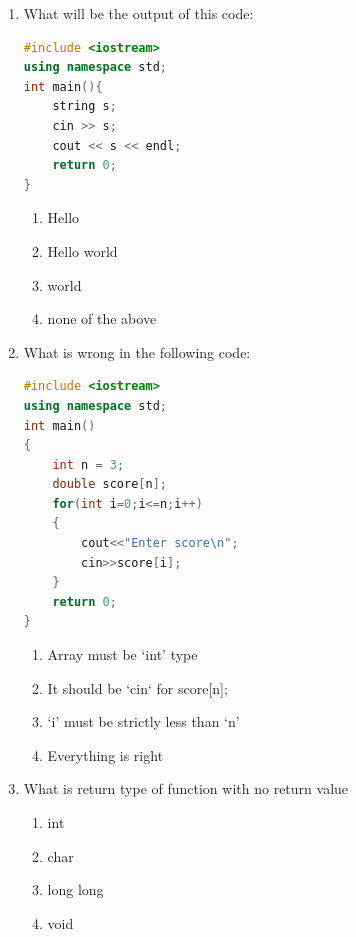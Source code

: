 \documentclass[10pt]{article}
\begin{document}
\begin{enumerate}
\item What will be the output of this code:
\begin{lstlisting}[language=C++]
#include <iostream>
using namespace std;
int main(){
    string s;
    cin >> s;
    cout << s << endl;
    return 0;
}
\end{lstlisting}
\begin{multicols}{4}
\begin{enumerate}
    \item Hello
    \item Hello world
    \item world
    \item none of the above
\end{enumerate}
\end{multicols}








\item What is wrong in the following code:
\begin{lstlisting}[language=C++]
#include <iostream>
using namespace std;
int main()
{
    int n = 3;
    double score[n];
    for(int i=0;i<=n;i++)
    {
        cout<<"Enter score\n";
        cin>>score[i];
    }
    return 0;
}
\end{lstlisting}
\begin{multicols}{4}
\begin{enumerate}
    \item Array must be ‘int’ type
    \item It should be ‘cin‘ for score[n];
    \item ‘i’ must be strictly less than ‘n’
    \item Everything is right
\end{enumerate}
\end{multicols}




\item What is return type of function with no return value
\begin{multicols}{4}
\begin{enumerate}
    \item int
    \item char
    \item long long
    \item void
\end{enumerate}
\end{multicols}






\end{enumerate}
\end{document}

